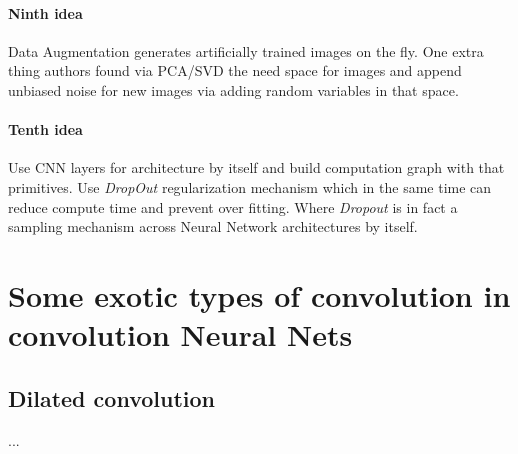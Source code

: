 \documentclass[12pt,a4paper]{article}
\theoremstyle{plain}
\begin{document}
\paragraph{Ninth idea} Data Augmentation generates artificially trained images on the fly. One extra thing authors found via PCA/SVD the need space for images and append unbiased noise for new images via adding random variables in that space.

\paragraph{Tenth idea} Use CNN layers for architecture by itself and build computation graph with that primitives. Use \textit{DropOut} regularization mechanism which in the same  time can reduce compute time and prevent over fitting. Where \textit{Dropout} is in fact a sampling mechanism across Neural Network architectures by itself.

\section{Some exotic types of convolution in convolution Neural Nets}
\subsection{Dilated convolution}
...
\end{document}
